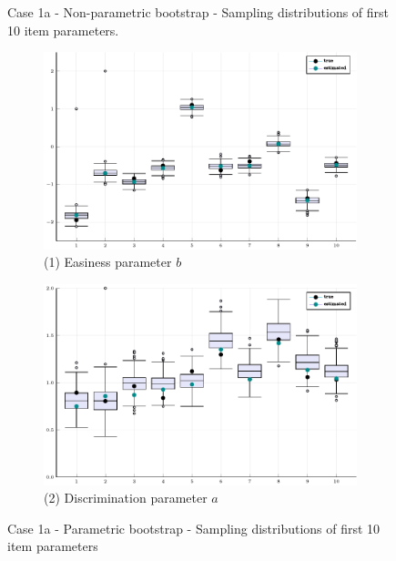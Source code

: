 \begin{figure}[H]
	\caption{Case 1a - Non-parametric bootstrap - Sampling distributions of first 10 item parameters.}
	\label{fig:sampdist10npar}
\end{figure}

\captionsetup[subfigure]{labelformat=empty}

\begin{figure}[H]
	\centering
	\begin{subfigure}[t]{0.8\textwidth}
		\centering
		\includegraphics[width=\linewidth]{Figures/bootstrap/BSb_par.pdf}
		\caption{(1) Easiness parameter $b$} 
	\end{subfigure}
	\begin{subfigure}[t]{0.8\textwidth}
		\centering
		\includegraphics[width=\linewidth]{Figures/bootstrap/BSa_par.pdf}
		\caption{(2) Discrimination parameter $a$} 
	\end{subfigure}
	
	\caption{Case 1a - Parametric bootstrap - Sampling distributions of first 10 item parameters}
	\label{fig:sampdist10par}
\end{figure}
